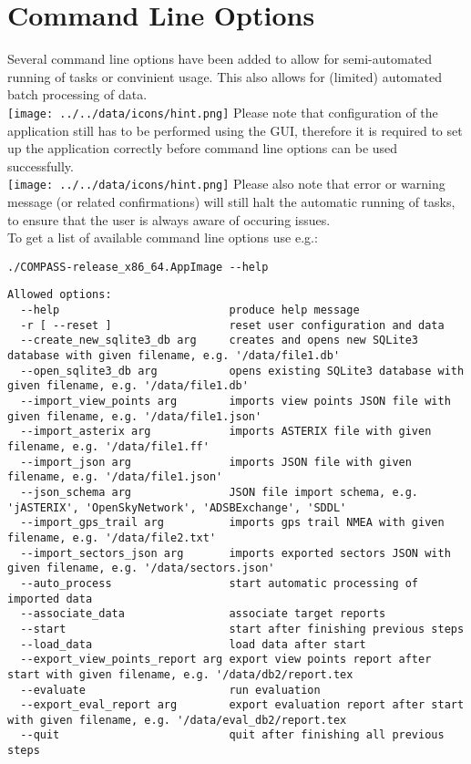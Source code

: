 \chapter{Command Line Options}
\label{sec:command_line} 

Several command line options have been added to allow for semi-automated running of tasks or convinient usage. This also allows for (limited) automated batch processing of data. \\

\texttt{[image: ../../data/icons/hint.png]} Please note that configuration of the application still has to be performed using the GUI, therefore it is required to set up the application correctly before command line options can be used successfully.\\

\texttt{[image: ../../data/icons/hint.png]} Please also note that error or warning message (or related confirmations) will still halt the automatic running of tasks, to ensure that the user is always aware of occuring issues. \\

To get a list of available command line options use e.g.:
\begin{lstlisting}
./COMPASS-release_x86_64.AppImage --help
\end{lstlisting}

\begin{lstlisting}
Allowed options:
  --help                          produce help message
  -r [ --reset ]                  reset user configuration and data
  --create_new_sqlite3_db arg     creates and opens new SQLite3 database with given filename, e.g. '/data/file1.db'
  --open_sqlite3_db arg           opens existing SQLite3 database with given filename, e.g. '/data/file1.db'
  --import_view_points arg        imports view points JSON file with given filename, e.g. '/data/file1.json'
  --import_asterix arg            imports ASTERIX file with given filename, e.g. '/data/file1.ff'
  --import_json arg               imports JSON file with given filename, e.g. '/data/file1.json'
  --json_schema arg               JSON file import schema, e.g. 'jASTERIX', 'OpenSkyNetwork', 'ADSBExchange', 'SDDL'
  --import_gps_trail arg          imports gps trail NMEA with given filename, e.g. '/data/file2.txt'
  --import_sectors_json arg       imports exported sectors JSON with given filename, e.g. '/data/sectors.json'
  --auto_process                  start automatic processing of imported data
  --associate_data                associate target reports
  --start                         start after finishing previous steps
  --load_data                     load data after start
  --export_view_points_report arg export view points report after start with given filename, e.g. '/data/db2/report.tex
  --evaluate                      run evaluation
  --export_eval_report arg        export evaluation report after start with given filename, e.g. '/data/eval_db2/report.tex
  --quit                          quit after finishing all previous steps

\end{lstlisting}
\ \\

